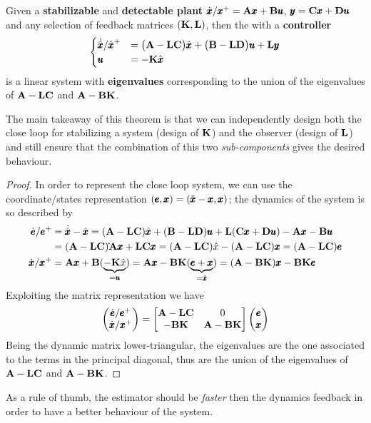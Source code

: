 	\begin{theorem}
		Given a \textbf{stabilizable} and \textbf{detectable plant} $\dot{\pmb{x}}/\pmb{x}^+ = \mathbf{A}\pmb{x} +\mathbf{B}\pmb{u}$, $\pmb{y} = \mathbf{C}\pmb{x} + \mathbf{D}\pmb{u}$ and any selection of feedback matrices $(\mathbf{K},\mathbf{L})$, then the  with a \textbf{controller}
		\[ \begin{cases}
			\dot{\hat {\pmb{x}}}/\hat {\pmb{x}}^+ & = \big(\mathbf{A}-\mathbf{L}\mathbf{C}\big)\hat {\pmb{x}} + \big(\mathbf{B} - \mathbf{L}\mathbf{D}\big) \pmb{u} + \mathbf{L} \pmb{y} \\ \pmb{u} & = - \mathbf{K} \hat {\pmb{x}}
		\end{cases} \]
		is a linear system with \textbf{eigenvalues} corresponding to the union of the eigenvalues of $\mathbf{A}-\mathbf{L}\mathbf{C}$ and $\mathbf{A}-\mathbf{B}\mathbf{K}$.
	\end{theorem}
	The main takeaway of this theorem is that we can independently design both the close loop for stabilizing a system (design of $\mathbf{K}$) and the observer (design of $\mathbf{L}$) and still ensure that the combination of this two \textit{sub-components} gives the desired behaviour.
	\begin{proof}
		In order to represent the close loop system, we can use the  coordinate/states representation $(\pmb{e}, \pmb{x}) = (\hat {\pmb{x}} - \pmb{x} , \pmb{x})$; the dynamics of the system is so described by
		\begin{align*}
			\dot{\pmb{e}}/\pmb{e}^+ & = \dot{\hat {\pmb{x}}} - \dot{\pmb{x}} = (\mathbf{A}-\mathbf{L}\mathbf{C})\hat {\pmb{x}} + (\mathbf{B}-\mathbf{L} \mathbf{D})\pmb{u} + \mathbf{L}(\mathbf{C}\pmb{x} + \mathbf{D}\pmb{u}) - \mathbf{A}\pmb{x} - \mathbf{B} \pmb{u} \\
			& = (\mathbf{A}-\mathbf{L}\mathbf{C}) \hat \- \mathbf{A}\pmb{x} + \mathbf{L}\mathbf{C}\pmb{x} = (\mathbf{A}-\mathbf{L}\mathbf{C}) \hat x - (\mathbf{A}-\mathbf{L} \mathbf{C}) \pmb{x} = (\mathbf{A}-\mathbf{L}\mathbf{C}) \pmb{e} \\
			\dot{\pmb{x}}/\pmb{x}^+ & = \mathbf{A}\pmb{x} + \mathbf{B}(\underbrace{-\mathbf{K}\hat x}_{=\pmb{u}}) = \mathbf{A}\pmb{x} - \mathbf{B}\mathbf{K}(\underbrace{\pmb{e} + \pmb{x}}_{=\hat {\pmb{x}}}) = (\mathbf{A}-\mathbf{B}\mathbf{K})\pmb{x} - \mathbf{B}\mathbf{K} \pmb{e}
		\end{align*}
		Exploiting the matrix representation we have
		\[ \begin{pmatrix}  \dot{\pmb{e}}/\pmb{e}^+ \\ \dot{\pmb{x}}/\pmb{x}^+ \end{pmatrix} = \begin{bmatrix} \mathbf{A}- \mathbf{L}\mathbf{C} & 0 \\ -\mathbf{B}\mathbf{K} & \mathbf{A}-\mathbf{B}\mathbf{K}  \end{bmatrix} \begin{pmatrix} \pmb{e} \\ \pmb{x} \end{pmatrix} \]
		Being the dynamic matrix lower-triangular, the eigenvalues are the one associated to the terms in the principal diagonal, thus are the union of the eigenvalues of $\mathbf{A} - \mathbf{L}\mathbf{C}$ and $\mathbf{A}- \mathbf{B}\mathbf{K}$.		
	\end{proof}
	As a rule of thumb, the estimator should be \textit{faster} then the dynamics feedback in order to have a better behaviour of the system.
	
